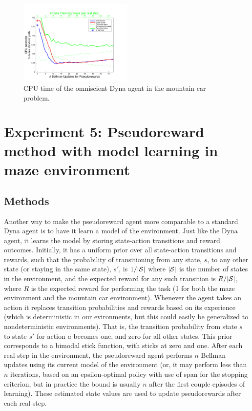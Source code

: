 \documentclass[letterpaper]{article}
\begin{document}
\begin{figure}[ht]
\centering
\includegraphics[width=0.5\textwidth]{MC_cpus_vs_PRiterations_omniscientDYNA_toGoal}
\caption{CPU time of the omniscient Dyna agent in the mountain car problem.}
\label{fig:S2b}
\end{figure}

\pagebreak

\section{Experiment 5: Pseudoreward method with model learning in maze environment}

\subsection{Methods}

Another way to make the pseudoreward agent more comparable to a standard Dyna agent is to have it learn a model of the environment. Just like the Dyna agent, it learns the model by storing state-action transitions and reward outcomes. Initially, it has a uniform prior over all state-action transitions and rewards, such that the probability of transitioning from any state, $s$, to any other state (or staying in the same state), $s'$, is $1/|{\cal S}|$ where $|{\cal S}|$ is the number of states in the environment, and the expected reward for any such transition is $R/|{\cal S}|$, where $R$ is the expected reward for performing the task (1 for both the maze environment and the mountain car environment). Whenever the agent takes an action it replaces transition probabilities and rewards based on its experience (which is deterministic in our evironments, but this could easily be generalized to nondeterministic environments). That is, the transition probability from state $s$ to state $s'$ for action $a$ becomes one, and zero for all other states. This prior corresponds to a bimodal stick function, with sticks at zero and one. After each real step in the environment, the pseudoreward agent performs $n$ Bellman updates using its current model of the environment (or, it may perform less than $n$ iterations, based on an epsilon-optimal policy with use of span for the stopping criterion, but in practice the bound is usually $n$ after the first couple episodes of learning). These estimated state values are used to update pseudorewards after each real step.
\end{document}
